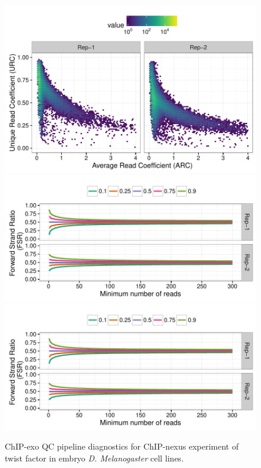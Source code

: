 \documentclass{article}
\begin{document}
\begin{figure}[H]
  \centering
  \includegraphics[width = .65\textwidth,page =
1]{figures/supplement/QC/ChIPnexus_embryo_twist_enrichment.pdf}\\
\includegraphics[width = .65\textwidth,page =
1]{figures/supplement/QC/ChIPnexus_embryo_twist_strand_imbalance.pdf}
\includegraphics[width = .65\textwidth,page =
3]{figures/supplement/QC/ChIPnexus_embryo_twist_strand_imbalance.pdf}
\caption{ChIP-exo QC pipeline diagnostics for ChIP-nexus experiment of
  twist factor in embryo \emph{D. Melanogaster} cell lines.}
  \label{sfig:qc8}
\end{figure}
\end{document}
